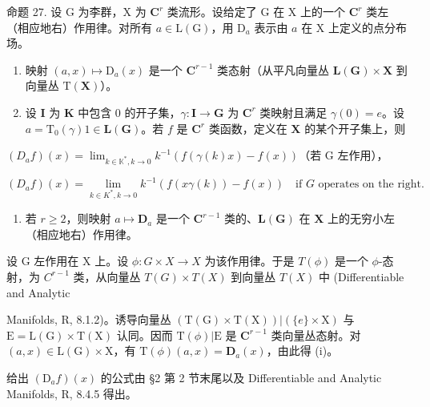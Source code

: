 命题 27. 设 G 为李群，X 为 \(\mathbf{C}^r\) 类流形。设给定了 G 在 X 上的一个 \(\mathbf{C}^r\) 类左（相应地右）作用律。对所有 \(a \in \mathrm{L}(\mathrm{G})\)，用 \(\mathrm{D}_a\) 表示由 \(a\) 在 X 上定义的点分布场。

\begin{enumerate}
\def\labelenumi{(\roman{enumi})}
\item
  映射 \((a, x) \mapsto \mathrm{D}_a(x)\) 是一个 \(\mathbf{C}^{r-1}\) 类态射（从平凡向量丛 \(\mathbf{L}(\mathbf{G}) \times \mathbf{X}\) 到向量丛 \(\mathrm{T}(\mathbf{X})\)）。
\item
  设 \(\mathbf{I}\) 为 \(\mathbf{K}\) 中包含 0 的开子集，\(\gamma: \mathbf{I} \to \mathbf{G}\) 为 \(\mathbf{C}^r\) 类映射且满足 \(\gamma(0) = e\)。设 \(a = \mathrm{T}_0(\gamma) 1 \in \mathbf{L}(\mathbf{G})\)。若 \(f\) 是 \(\mathbf{C}^r\) 类函数，定义在 \(\mathbf{X}\) 的某个开子集上，则
\end{enumerate}

\((D_{a}f)(x) = \lim_{k\in \mathbb{K}^{*},k\to 0}k^{-1}(f(\gamma (k)x) - f(x))\)（若 G 左作用），

\[
(D _ {a} f) (x) = \lim _ {k \in K ^ {*}, k \rightarrow 0} k ^ {- 1} (f (x \gamma (k)) - f (x)) \quad \text {if } G \text { operates on the right}.
\]

\begin{enumerate}
\def\labelenumi{(\roman{enumi})}
\setcounter{enumi}{2}
\tightlist
\item
  若 \(r \geqslant 2\)，则映射 \(a \mapsto \mathbf{D}_a\) 是一个 \(\mathbf{C}^{r-1}\) 类的、\(\mathbf{L}(\mathbf{G})\) 在 \(\mathbf{X}\) 上的无穷小左（相应地右）作用律。
\end{enumerate}

设 G 左作用在 X 上。设 \(\phi: G \times X \to X\) 为该作用律。于是 \(T(\phi)\) 是一个 \(\phi\)-态射，为 \(C^{r-1}\) 类，从向量丛 \(T(G) \times T(X)\) 到向量丛 \(T(X)\) 中 (Differentiable and Analytic

Manifolds, R, 8.1.2)。诱导向量丛 \((\mathrm{T}(\mathrm{G}) \times \mathrm{T}(\mathrm{X}))|(\{e\} \times \mathrm{X})\) 与 \(\mathrm{E} = \mathrm{L}(\mathrm{G}) \times \mathrm{T}(\mathrm{X})\) 认同。因而 \(\mathrm{T}(\phi)|\mathrm{E}\) 是 \(\mathbf{C}^{r-1}\) 类向量丛态射。对 \((a, x) \in \mathrm{L}(\mathrm{G}) \times \mathrm{X}\)，有 \(\mathrm{T}(\phi)(a, x) = \mathbf{D}_{a}(x)\)，由此得 (i)。

给出 \((\mathrm{D}_a f)(x)\) 的公式由 §2 第 2 节末尾以及 Differentiable and Analytic Manifolds, R, 8.4.5 得出。

